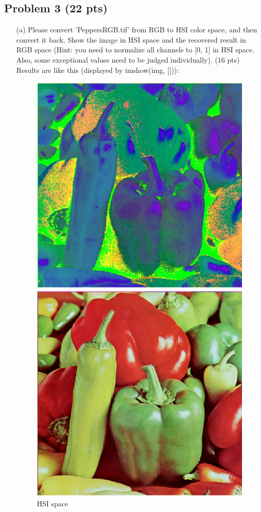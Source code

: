 \documentclass[11pt,letterpaper]{article}
\begin{document}
\subsection*{Problem 3 (22 pts)}
\begin{itemize}
\item[(a)] Please convert 'PeppersRGB.tif' from RGB to HSI color space, and then convert it back. Show the image in HSI space and the recovered result in RGB space (Hint: you need to normalize all channels to [0, 1] in HSI space. Also, some exceptional values need to be judged individually). (16 pts)\\
Results are like this (displayed by imshow(img, [])):\\
\begin{figure}[htbp]
	\centering
	\begin{minipage}{0.49\linewidth}
		\centering
		\includegraphics[width=0.8\linewidth]{hsi_space.png}
		\caption{HSI space}
	\end{minipage}
	\begin{minipage}{0.49\linewidth}
		\centering
		\includegraphics[width=0.8\linewidth]{rgb_space.png}

\end{minipage}
\end{figure}
\end{itemize}
\end{document}
